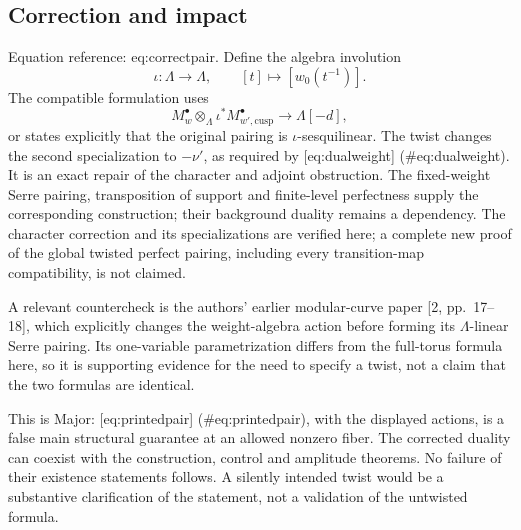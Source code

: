 \documentclass[10pt]{article}
\begin{document}
\subsection*{Correction and impact}
Equation reference: eq:correctpair. Define the algebra involution \[\iota:\Lambda\longrightarrow\Lambda,\qquad
 [t]\longmapsto[w_0(t^{-1})].\] The compatible formulation uses \[
 M_w^\bullet\otimes_\Lambda
 \iota^*M_{w',\mathrm{cusp}}^\bullet\longrightarrow\Lambda[-d],\] or states explicitly that the original pairing is \(\iota\)-sesquilinear. The twist changes the second specialization to \(-\nu'\), as required by [eq:dualweight] (\#eq:dualweight). It is an exact repair of the character and adjoint obstruction. The fixed-weight Serre pairing, transposition of support and finite-level perfectness supply the corresponding construction; their background duality remains a dependency. The character correction and its specializations are verified here; a complete new proof of the global twisted perfect pairing, including every transition-map compatibility, is not claimed.\par
A relevant countercheck is the authors’ earlier modular-curve paper [2, pp. 17–18], which explicitly changes the weight-algebra action before forming its \(\Lambda\)-linear Serre pairing. Its one-variable parametrization differs from the full-torus formula here, so it is supporting evidence for the need to specify a twist, not a claim that the two formulas are identical.\par
This is Major: [eq:printedpair] (\#eq:printedpair), with the displayed actions, is a false main structural guarantee at an allowed nonzero fiber. The corrected duality can coexist with the construction, control and amplitude theorems. No failure of their existence statements follows. A silently intended twist would be a substantive clarification of the statement, not a validation of the untwisted formula.\par
\end{document}
